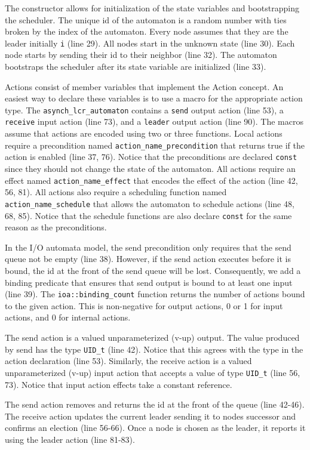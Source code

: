 The constructor allows for initialization of the state variables and bootstrapping the scheduler.
The unique id of the automaton is a random number with ties broken by the index of the automaton.
Every node assumes that they are the leader initially \verb+i+ (line 29).
All nodes start in the unknown state (line 30).
Each node starts by sending their id to their neighbor (line 32).
The automaton bootstraps the scheduler after its state variable are initialized (line 33).

Actions consist of member variables that implement the Action concept.
An easiest way to declare these variables is to use a macro for the appropriate action type.
The \verb+asynch_lcr_automaton+ contains a \verb+send+ output action (line 53), a \verb+receive+ input action (line 73), and a \verb+leader+ output action (line 90).
The macros assume that actions are encoded using two or three functions.
Local actions require a precondition named \verb+action_name_precondition+ that returns true if the action is enabled (line 37, 76).
Notice that the preconditions are declared \verb+const+ since they should not change the state of the automaton.
All actions require an effect named \verb+action_name_effect+ that encodes the effect of the action (line 42, 56, 81).
All actions also require a scheduling function named \verb+action_name_schedule+ that allows the automaton to schedule actions (line 48, 68, 85).
Notice that the schedule functions are also declare \verb+const+ for the same reason as the preconditions.

In the I/O automata model, the send precondition only requires that the send queue not be empty (line 38).
However, if the send action executes before it is bound, the id at the front of the send queue will be lost.
Consequently, we add a binding predicate that ensures that send output is bound to at least one input (line 39).
The \verb+ioa::binding_count+ function returns the number of actions bound to the given action.
This is non-negative for output actions, 0 or 1 for input actions, and 0 for internal actions.

The send action is a valued unparameterized (v-up) output.
The value produced by send has the type \verb+UID_t+ (line 42).
Notice that this agrees with the type in the action declaration (line 53).
Similarly, the receive action is a valued unparameterized (v-up) input action that accepts a value of type \verb+UID_t+ (line 56, 73).
Notice that input action effects take a constant reference.

The send action removes and returns the id at the front of the queue (line 42-46).
The receive action updates the current leader sending it to nodes successor and confirms an election (line 56-66).
Once a node is chosen as the leader, it reports it using the leader action (line 81-83).

